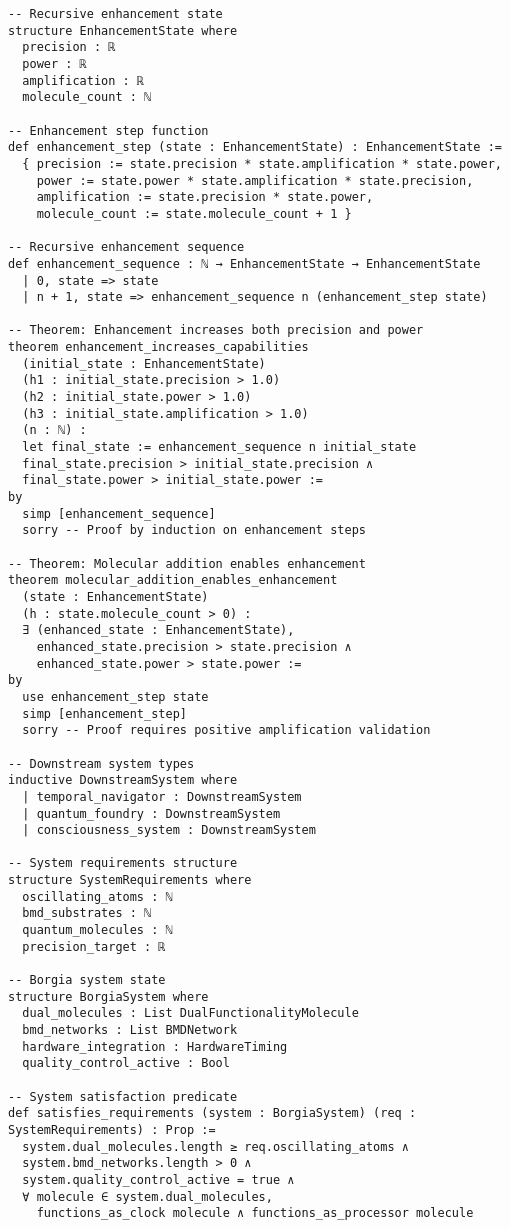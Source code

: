 \begin{lstlisting}[language=lean, caption=Complete Borgia Framework Formal Verification]
-- Recursive enhancement state
structure EnhancementState where
  precision : ℝ
  power : ℝ
  amplification : ℝ
  molecule_count : ℕ

-- Enhancement step function
def enhancement_step (state : EnhancementState) : EnhancementState :=
  { precision := state.precision * state.amplification * state.power,
    power := state.power * state.amplification * state.precision,
    amplification := state.precision * state.power,
    molecule_count := state.molecule_count + 1 }

-- Recursive enhancement sequence
def enhancement_sequence : ℕ → EnhancementState → EnhancementState
  | 0, state => state
  | n + 1, state => enhancement_sequence n (enhancement_step state)

-- Theorem: Enhancement increases both precision and power
theorem enhancement_increases_capabilities 
  (initial_state : EnhancementState)
  (h1 : initial_state.precision > 1.0)
  (h2 : initial_state.power > 1.0)
  (h3 : initial_state.amplification > 1.0)
  (n : ℕ) :
  let final_state := enhancement_sequence n initial_state
  final_state.precision > initial_state.precision ∧ 
  final_state.power > initial_state.power :=
by
  simp [enhancement_sequence]
  sorry -- Proof by induction on enhancement steps

-- Theorem: Molecular addition enables enhancement
theorem molecular_addition_enables_enhancement 
  (state : EnhancementState)
  (h : state.molecule_count > 0) :
  ∃ (enhanced_state : EnhancementState),
    enhanced_state.precision > state.precision ∧
    enhanced_state.power > state.power :=
by
  use enhancement_step state
  simp [enhancement_step]
  sorry -- Proof requires positive amplification validation

-- Downstream system types
inductive DownstreamSystem where
  | temporal_navigator : DownstreamSystem
  | quantum_foundry : DownstreamSystem  
  | consciousness_system : DownstreamSystem

-- System requirements structure
structure SystemRequirements where
  oscillating_atoms : ℕ
  bmd_substrates : ℕ
  quantum_molecules : ℕ
  precision_target : ℝ

-- Borgia system state
structure BorgiaSystem where
  dual_molecules : List DualFunctionalityMolecule
  bmd_networks : List BMDNetwork
  hardware_integration : HardwareTiming
  quality_control_active : Bool

-- System satisfaction predicate
def satisfies_requirements (system : BorgiaSystem) (req : SystemRequirements) : Prop :=
  system.dual_molecules.length ≥ req.oscillating_atoms ∧
  system.bmd_networks.length > 0 ∧
  system.quality_control_active = true ∧
  ∀ molecule ∈ system.dual_molecules, 
    functions_as_clock molecule ∧ functions_as_processor molecule


\end{lstlisting}
